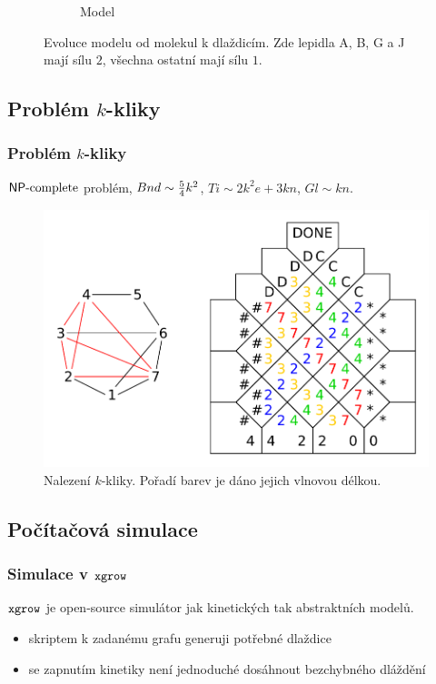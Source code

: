 \documentclass[10pt]{beamer}
\newcommand{\NPC}{\mathsf{NP}\textnormal{-complete}}
\theoremstyle{definition}
\theoremstyle{remark}
\begin{document}
\begin{frame}
\begin{figure}[H]
\begin{center}
\begin{subfigure}[b]{0.25\textwidth}
			\caption{Model}
		\end{subfigure}
		\caption{Evoluce modelu od molekul k dlaždicím. Zde lepidla {\sf A}, {\sf B}, {\sf G} a {\sf J} mají sílu $2$, všechna ostatní mají sílu $1$.}
		\label{fig:evolution}
	\end{center}
	\end{figure}
\end{frame}

\subsection{Problém $k$-kliky}
\begin{frame}
\frametitle{Problém $k$-kliky}
	$\NPC$ problém, $Bnd \sim \nicefrac{5}{4}k^2$, $Ti \sim 2k^2e + 3kn$, $Gl \sim kn$.
	\begin{figure}[h]
	\begin{center}
		\includegraphics[scale=0.6]{../figures/k-clique/k-clique.pdf}
		\caption{Nalezení $k$-kliky. Pořadí barev je dáno jejich vlnovou délkou.}
	\end{center}
	\end{figure}
\end{frame}

\subsection{Počítačová simulace}
\begin{frame}
\frametitle{Simulace v $\tt xgrow$}
	$\tt xgrow$ je open-source simulátor jak kinetických tak abstraktních modelů.
	\begin{itemize}
		\item skriptem k zadanému grafu generuji potřebné dlaždice
		\item se zapnutím kinetiky není jednoduché dosáhnout bezchybného dláždění
	\end{itemize}
\end{frame}
\end{document}
